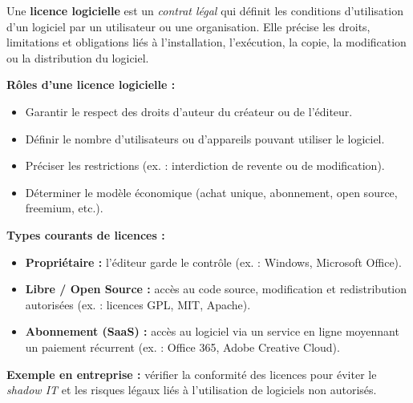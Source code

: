 \documentclass[a4paper,11pt]{article}
\begin{document}
\begin{tcolorbox}[colback=orange!5,colframe=orange!60!black,title=Qu'est-ce qu'une licence logicielle ?]

Une \textbf{licence logicielle} est un \textit{contrat légal} qui définit les conditions d’utilisation 
d’un logiciel par un utilisateur ou une organisation.  
Elle précise les droits, limitations et obligations liés à l’installation, l’exécution, la copie, la 
modification ou la distribution du logiciel.  

\medskip
\textbf{Rôles d’une licence logicielle :}
\begin{itemize}
  \item Garantir le respect des droits d’auteur du créateur ou de l’éditeur.
  \item Définir le nombre d’utilisateurs ou d’appareils pouvant utiliser le logiciel.
  \item Préciser les restrictions (ex. : interdiction de revente ou de modification).
  \item Déterminer le modèle économique (achat unique, abonnement, open source, freemium, etc.).
\end{itemize}

\medskip
\textbf{Types courants de licences :}
\begin{itemize}
  \item \textbf{Propriétaire :} l’éditeur garde le contrôle (ex. : Windows, Microsoft Office).
  \item \textbf{Libre / Open Source :} accès au code source, modification et redistribution autorisées 
        (ex. : licences GPL, MIT, Apache).
  \item \textbf{Abonnement (SaaS) :} accès au logiciel via un service en ligne moyennant un paiement récurrent (ex. : Office 365, Adobe Creative Cloud).
\end{itemize}

\medskip
\textbf{Exemple en entreprise :} vérifier la conformité des licences pour éviter le \textit{shadow IT} 
et les risques légaux liés à l’utilisation de logiciels non autorisés.
\end{tcolorbox}
\end{document}
